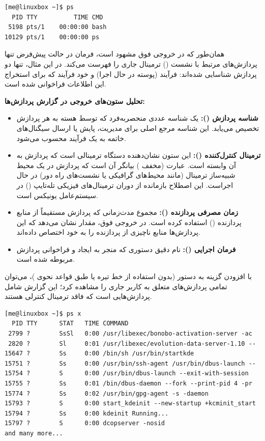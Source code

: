 \begin{latin}
\begin{lstlisting}
[me@linuxbox ~]$ ps
  PID TTY          TIME CMD
 5198 pts/1    00:00:00 bash
10129 pts/1    00:00:00 ps
\end{lstlisting}
\end{latin}

همان‌طور که در خروجی فوق مشهود است، فرمان  در حالت پیش‌فرض تنها پردازش‌های مرتبط با نشست () ترمینال جاری را فهرست می‌کند. در این مثال، تنها دو پردازش شناسایی شده‌اند: فرآیند  (پوسته در حال اجرا) و خود فرآیند  که برای استخراج این اطلاعات فراخوانی شده است.

\textbf{تحلیل ستون‌های خروجی در گزارش پردازش‌ها:}

\begin{itemize}
  \item \textbf{شناسه پردازش ():} یک شناسه عددی منحصربه‌فرد که توسط هسته به هر پردازش تخصیص می‌یابد. این شناسه مرجع اصلی برای مدیریت، پایش یا ارسال سیگنال‌های خاتمه به یک فرآیند محسوب می‌شود.
  \item \textbf{ترمینال کنترل‌کننده ():} این ستون نشان‌دهنده دستگاه ترمینالی است که پردازش به آن وابسته است. عبارت  (مخفف ) بیانگر آن است که پردازش در یک محیط شبیه‌ساز ترمینال (مانند محیط‌های گرافیکی یا نشست‌های راه دور) در حال اجراست. این اصطلاح بازمانده از دوران ترمینال‌های فیزیکی تله‌تایپ () در سیستم‌عامل یونیکس است.
  \item \textbf{زمان مصرفی پردازنده ():} مجموع مدت‌زمانی که پردازش مستقیماً از منابع پردازنده () استفاده کرده است. در خروجی فوق، مقدار  نشان می‌دهد که این پردازش‌ها منابع ناچیزی از پردازنده را به خود اختصاص داده‌اند.
  \item \textbf{فرمان اجرایی ():} نام دقیق دستوری که منجر به ایجاد و فراخوانی پردازش مربوطه شده است.
\end{itemize}

با افزودن گزینه  به دستور  (بدون استفاده از خط تیره یا  طبق قواعد نحوی )، می‌توان تمامی پردازش‌های متعلق به کاربر جاری را مشاهده کرد؛ این گزارش شامل پردازش‌هایی است که فاقد ترمینال کنترلی هستند.

\begin{latin}
\begin{lstlisting}
[me@linuxbox ~]$ ps x
  PID TTY      STAT   TIME COMMAND
 2799 ?        SsSl   0:00 /usr/libexec/bonobo-activation-server -ac
 2820 ?        Sl     0:01 /usr/libexec/evolution-data-server-1.10 --
15647 ?        Ss     0:00 /bin/sh /usr/bin/startkde
15751 ?        Ss     0:00 /usr/bin/ssh-agent /usr/bin/dbus-launch --
15754 ?        S      0:00 /usr/bin/dbus-launch --exit-with-session
15755 ?        Ss     0:01 /bin/dbus-daemon --fork --print-pid 4 -pr
15774 ?        Ss     0:02 /usr/bin/gpg-agent -s -daemon
15793 ?        S      0:00 start_kdeinit --new-startup +kcminit_start
15794 ?        Ss     0:00 kdeinit Running...
15797 ?        S      0:00 dcopserver -nosid
and many more...
\end{lstlisting}
\end{latin}

